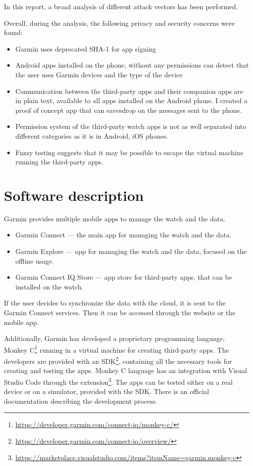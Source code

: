 In this report, a broad analysis of different attack vectors has been performed.

Overall, during the analysis, the following privacy and security concerns were found:
\begin{itemize}
    \item Garmin uses deprecated SHA-1 for app signing
    \item Android apps installed on the phone, without any permissions can detect that the user uses Garmin devices and the type of the device
    \item Communication between the third-party apps and their companion apps are in plain text, available to all apps installed on the Android phone.
    I created a proof of concept app that can eavesdrop on the messages sent to the phone.
    \item Permission system of the third-party watch apps is not as well separated into different categories as it is in Android, iOS phones.
    \item Fuzzy testing suggests that it may be possible to escape the virtual machine running the third-party apps.
\end{itemize}


\section{Software description}
Garmin provides multiple mobile apps to manage the watch and the data.
\begin{itemize}
    \item Garmin Connect — the main app for managing the watch and the data.
    \item Garmin Explore — app for managing the watch and the data, focused on the offline usage.
    \item Garmin Connect IQ Store — app store for third-party apps, that can be installed on the watch.
\end{itemize}

If the user decides to synchronize the data with the cloud, it is sent to the Garmin Connect services.
Then it can be accessed through the website or the mobile app.

Additionally, Garmin has developed a proprietary programming language, Monkey C\footnote{\url{https://developer.garmin.com/connect-iq/monkey-c/}} running in a virtual machine for creating third-party apps.
The developers are provided with an SDK\footnote{\url{https://developer.garmin.com/connect-iq/overview/}}, containing all the necessary tools for creating and testing the apps.
Monkey C language has an integration with Visual Studio Code through the extension\footnote{\url{https://marketplace.visualstudio.com/items?itemName=garmin.monkey-c}}.
The apps can be tested either on a real device or on a simulator, provided with the SDK\@.
There is an official documentation describing the development process.

